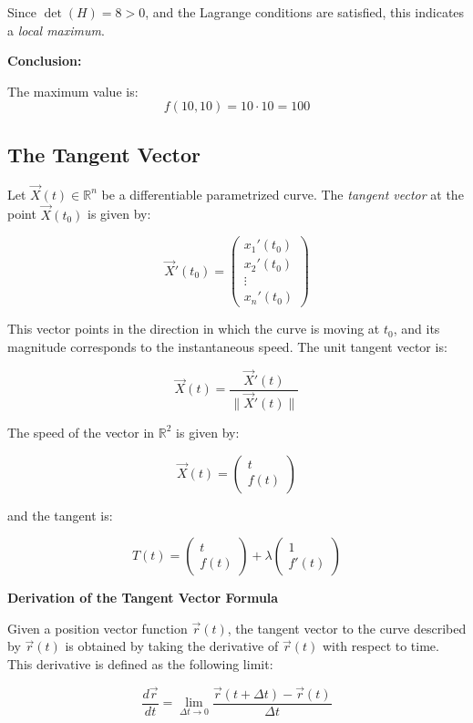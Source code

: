 Since \( \det(H) = 8 > 0 \), and the Lagrange conditions are satisfied, this indicates a \emph{local maximum}.

\textbf{Conclusion:}

The maximum value is:
\[
f(10, 10) = 10 \cdot 10 = \boxed{100}
\]


\subsection{The Tangent Vector}

Let \( \vec{X}(t) \in \mathbb{R}^n \) be a differentiable parametrized curve. The \emph{tangent vector} at the point 
\( \vec{X}(t_0) \) is given by:

\[
\vec{X}'(t_0) = \begin{pmatrix}
    x_1 ' (t_0) \\ x_2 ' (t_0) \\ \vdots \\ x_n ' (t_0)
\end{pmatrix}
\]

This vector points in the direction in which the curve is moving at \( t_0 \), and its magnitude corresponds to the
 instantaneous speed. The unit tangent vector is:

\[
\vec{X}(t) = \frac{\vec{X}'(t)}{\|\vec{X}'(t)\|}
\]

The speed of the vector in \(\mathbb{R}^2\) is given by:

\[
\vec{X}(t) = \begin{pmatrix}
    t \\ f(t)
\end{pmatrix}
\]

and the tangent is:

\[
T(t) = \begin{pmatrix}
    t \\ f(t)
\end{pmatrix} + \lambda \begin{pmatrix}
    1 \\ f'(t)
\end{pmatrix}
\]

\textbf{Derivation of the Tangent Vector Formula}

Given a position vector function \(\vec{r}(t)\), the tangent vector to the curve described by \(\vec{r}(t)\) is 
obtained by taking the derivative of \(\vec{r}(t)\) with respect to time. This derivative is defined as the following limit:

\[
\frac{d\vec{r}}{dt} = \lim_{\Delta t \to 0} \frac{\vec{r}(t + \Delta t) - \vec{r}(t)}{\Delta t}
\]

